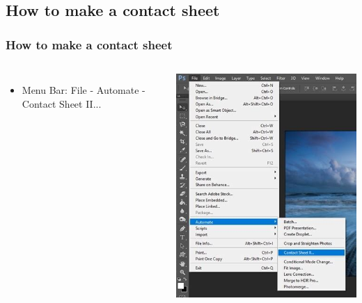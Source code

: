\documentclass{beamer}
\begin{document}
	\subsection{How to make a contact sheet}
	\begin{frame}
		\frametitle{How to make a contact sheet}
		\begin{columns}
	\vspace{-25pt}
	\begin{itemize}
		\item Menu Bar:  File - Automate - Contact Sheet II...
	\end{itemize}
	\includegraphics[width=.85\textwidth]{images/contact2.jpg}
\end{columns}
	\end{frame}
\end{document}
